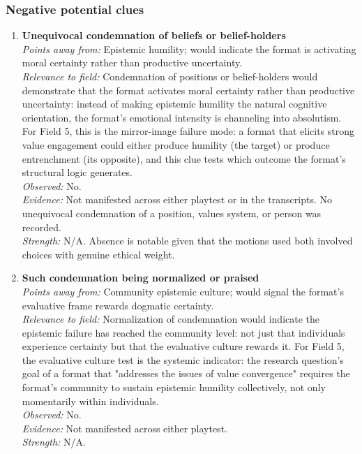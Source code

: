 \documentclass[12pt]{article}
\begin{document}
\subsubsection*{Negative potential clues}

\begin{enumerate}

\item \textbf{Unequivocal condemnation of beliefs or belief-holders}\\
\textit{Points away from:} Epistemic humility; would indicate the format is activating moral certainty rather than productive uncertainty.\\
\textit{Relevance to field:} Condemnation of positions or belief-holders would demonstrate that the format activates moral certainty rather than productive uncertainty: instead of making epistemic humility the natural cognitive orientation, the format's emotional intensity is channeling into absolutism. For Field 5, this is the mirror-image failure mode: a format that elicits strong value engagement could either produce humility (the target) or produce entrenchment (its opposite), and this clue tests which outcome the format's structural logic generates.\\
\textit{Observed:} No.\\
\textit{Evidence:} Not manifested across either playtest or in the transcripts. No unequivocal condemnation of a position, values system, or person was recorded.\\
\textit{Strength:} N/A. Absence is notable given that the motions used both involved choices with genuine ethical weight.

\item \textbf{Such condemnation being normalized or praised}\\
\textit{Points away from:} Community epistemic culture; would signal the format's evaluative frame rewards dogmatic certainty.\\
\textit{Relevance to field:} Normalization of condemnation would indicate the epistemic failure has reached the community level: not just that individuals experience certainty but that the evaluative culture rewards it. For Field 5, the evaluative culture test is the systemic indicator: the research question's goal of a format that "addresses the issues of value convergence" requires the format's community to sustain epistemic humility collectively, not only momentarily within individuals.\\
\textit{Observed:} No.\\
\textit{Evidence:} Not manifested across either playtest.\\
\textit{Strength:} N/A.

\end{enumerate}




\newpage
\printbibliography[title={REFERENCES}]
\end{document}
